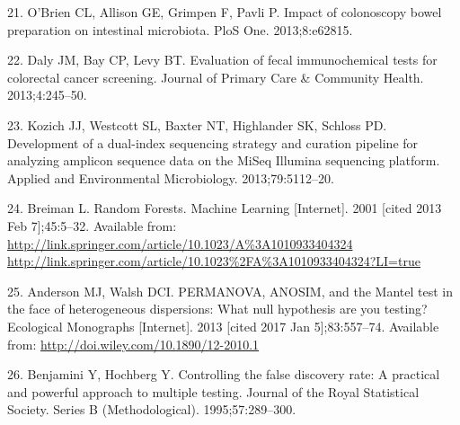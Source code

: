 \documentclass[12pt,]{article}
\begin{document}
\hypertarget{ref-obrien_impact_2013}{}
21. O'Brien CL, Allison GE, Grimpen F, Pavli P. Impact of colonoscopy
bowel preparation on intestinal microbiota. PloS One. 2013;8:e62815.

\hypertarget{ref-daly_evaluation_2013}{}
22. Daly JM, Bay CP, Levy BT. Evaluation of fecal immunochemical tests
for colorectal cancer screening. Journal of Primary Care \& Community
Health. 2013;4:245--50.

\hypertarget{ref-kozich_development_2013}{}
23. Kozich JJ, Westcott SL, Baxter NT, Highlander SK, Schloss PD.
Development of a dual-index sequencing strategy and curation pipeline
for analyzing amplicon sequence data on the MiSeq Illumina sequencing
platform. Applied and Environmental Microbiology. 2013;79:5112--20.

\hypertarget{ref-breiman_random_2001}{}
24. Breiman L. Random Forests. Machine Learning {[}Internet{]}. 2001
{[}cited 2013 Feb 7{]};45:5--32. Available from:
\href{http://link.springer.com/article/10.1023/A\%3A1010933404324\%20http://link.springer.com/article/10.1023\%2FA\%3A1010933404324?LI=true}{http://link.springer.com/article/10.1023/A\%3A1010933404324 http://link.springer.com/article/10.1023\%2FA\%3A1010933404324?LI=true}

\hypertarget{ref-anderson_permanova_2013}{}
25. Anderson MJ, Walsh DCI. PERMANOVA, ANOSIM, and the Mantel test in
the face of heterogeneous dispersions: What null hypothesis are you
testing? Ecological Monographs {[}Internet{]}. 2013 {[}cited 2017 Jan
5{]};83:557--74. Available from:
\url{http://doi.wiley.com/10.1890/12-2010.1}

\hypertarget{ref-benjamini_controlling_1995}{}
26. Benjamini Y, Hochberg Y. Controlling the false discovery rate: A
practical and powerful approach to multiple testing. Journal of the
Royal Statistical Society. Series B (Methodological). 1995;57:289--300.
\end{document}
